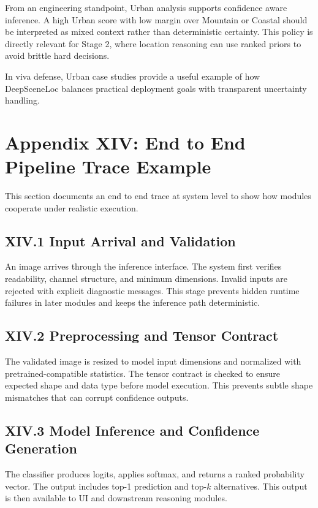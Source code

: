 From an engineering standpoint, Urban analysis supports confidence aware inference. A high Urban score with low margin over Mountain or Coastal should be interpreted as mixed context rather than deterministic certainty. This policy is directly relevant for Stage 2, where location reasoning can use ranked priors to avoid brittle hard decisions.

In viva defense, Urban case studies provide a useful example of how DeepSceneLoc balances practical deployment goals with transparent uncertainty handling.

\section*{Appendix XIV: End to End Pipeline Trace Example}

This section documents an end to end trace at system level to show how modules cooperate under realistic execution.

\subsection*{XIV.1 Input Arrival and Validation}
An image arrives through the inference interface. The system first verifies readability, channel structure, and minimum dimensions. Invalid inputs are rejected with explicit diagnostic messages. This stage prevents hidden runtime failures in later modules and keeps the inference path deterministic.

\subsection*{XIV.2 Preprocessing and Tensor Contract}
The validated image is resized to model input dimensions and normalized with pretrained-compatible statistics. The tensor contract is checked to ensure expected shape and data type before model execution. This prevents subtle shape mismatches that can corrupt confidence outputs.

\subsection*{XIV.3 Model Inference and Confidence Generation}
The classifier produces logits, applies softmax, and returns a ranked probability vector. The output includes top-1 prediction and top-$k$ alternatives. This output is then available to UI and downstream reasoning modules.

